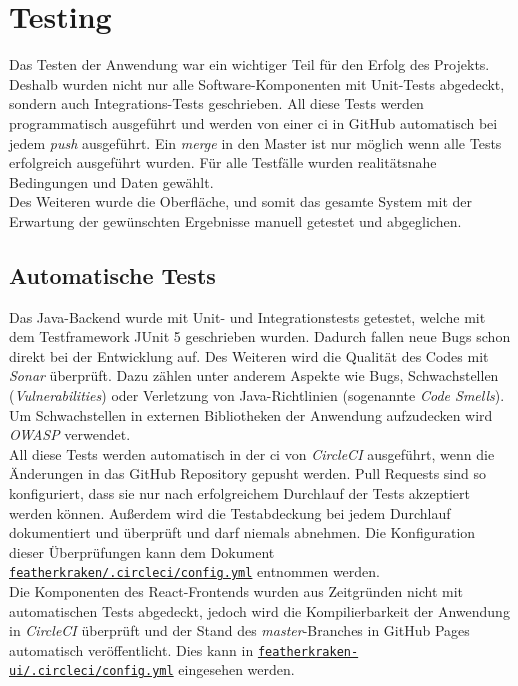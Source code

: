 \documentclass[12pt,twoside,a4paper]{article}
\begin{document}
\section{Testing}
Das Testen der Anwendung war ein wichtiger Teil für den Erfolg des Projekts. Deshalb wurden nicht nur alle Software-Komponenten mit Unit-Tests abgedeckt, sondern auch Integrations-Tests geschrieben. All diese Tests werden programmatisch ausgeführt und werden von einer \acrshort{ci} in GitHub automatisch bei jedem \textit{push} ausgeführt. Ein \textit{merge} in den Master ist nur möglich wenn alle Tests erfolgreich ausgeführt wurden. Für alle Testfälle wurden realitätsnahe Bedingungen und Daten gewählt.\\
Des Weiteren wurde die Oberfläche, und somit das gesamte System mit der Erwartung der gewünschten Ergebnisse manuell getestet und abgeglichen.
\subsection{Automatische Tests}
Das Java-Backend wurde mit Unit- und Integrationstests getestet, welche mit dem Testframework JUnit 5 geschrieben wurden. Dadurch fallen neue Bugs schon direkt bei der Entwicklung auf. Des Weiteren wird die Qualität des Codes mit \textit{Sonar} überprüft. Dazu zählen unter anderem Aspekte wie Bugs, Schwachstellen (\textit{Vulnerabilities}) oder Verletzung von Java-Richtlinien (sogenannte \textit{Code Smells}). Um Schwachstellen in externen Bibliotheken der Anwendung aufzudecken wird \textit{OWASP} verwendet.\\
All diese Tests werden automatisch in der \acrfull{ci} von \textit{CircleCI} ausgeführt, wenn die Änderungen in das GitHub Repository gepusht werden. Pull Requests sind so konfiguriert, dass sie nur nach erfolgreichem Durchlauf der Tests akzeptiert werden können. Außerdem wird die Testabdeckung bei jedem Durchlauf dokumentiert und überprüft und darf niemals abnehmen. Die Konfiguration dieser Überprüfungen kann dem Dokument \href{https://github.com/featherkraken/featherkraken/blob/master/.circleci/config.yml}{\texttt{featherkraken/.circleci/config.yml}} entnommen werden.\\
Die Komponenten des React-Frontends wurden aus Zeitgründen nicht mit automatischen Tests abgedeckt, jedoch wird die Kompilierbarkeit der Anwendung in \textit{CircleCI} überprüft und der Stand des \textit{master}-Branches in GitHub Pages automatisch veröffentlicht. Dies kann in \href{https://github.com/featherkraken/featherkraken-ui/blob/master/.circleci/config.yml}{\texttt{featherkraken-ui/.circleci/config.yml}} eingesehen werden.
\end{document}
